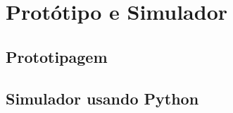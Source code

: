 \chapter{Protótipo e Simulador}

\lipsum[1] %

\section{Prototipagem}


\section{ Simulador usando Python}
